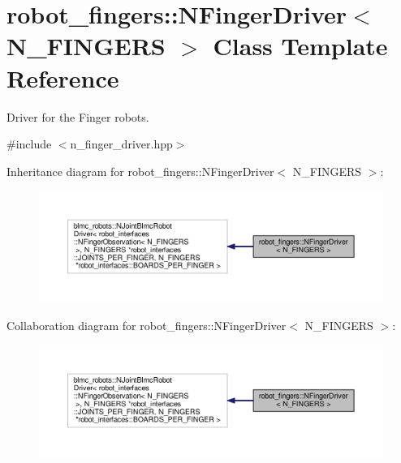\hypertarget{classrobot__fingers_1_1NFingerDriver}{}\section{robot\+\_\+fingers\+:\+:N\+Finger\+Driver$<$ N\+\_\+\+F\+I\+N\+G\+E\+RS $>$ Class Template Reference}
\label{classrobot__fingers_1_1NFingerDriver}


Driver for the Finger robots.  




{\ttfamily \#include $<$n\+\_\+finger\+\_\+driver.\+hpp$>$}



Inheritance diagram for robot\+\_\+fingers\+:\+:N\+Finger\+Driver$<$ N\+\_\+\+F\+I\+N\+G\+E\+RS $>$\+:
\nopagebreak
\begin{figure}[H]
\begin{center}
\leavevmode
\includegraphics[width=350pt]{classrobot__fingers_1_1NFingerDriver__inherit__graph}
\end{center}
\end{figure}


Collaboration diagram for robot\+\_\+fingers\+:\+:N\+Finger\+Driver$<$ N\+\_\+\+F\+I\+N\+G\+E\+RS $>$\+:
\nopagebreak
\begin{figure}[H]
\begin{center}
\leavevmode
\includegraphics[width=350pt]{classrobot__fingers_1_1NFingerDriver__coll__graph}
\end{center}
\end{figure}
